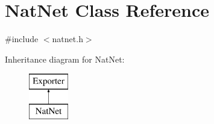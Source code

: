\hypertarget{class_nat_net}{\section{\-Nat\-Net \-Class \-Reference}
\label{class_nat_net}
}


{\ttfamily \#include $<$natnet.\-h$>$}

\-Inheritance diagram for \-Nat\-Net\-:\begin{figure}[H]
\begin{center}
\leavevmode
\includegraphics[height=2.000000cm]{class_nat_net}
\end{center}
\end{figure}
